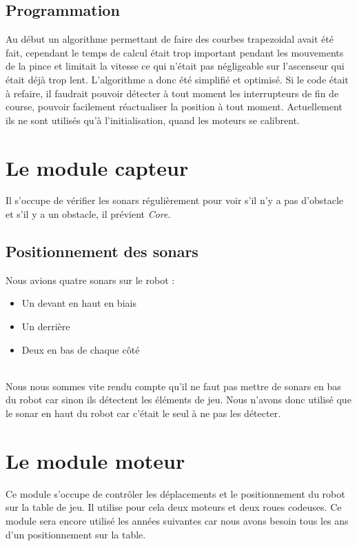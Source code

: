 \subsection{Programmation}
Au début un algorithme permettant de faire des courbes trapezoidal avait été fait, cependant le temps de calcul était trop important pendant les mouvements de la pince et limitait la vitesse ce qui n'était pas négligeable sur l'ascenseur qui était déjà trop lent. L'algorithme a donc été simplifié et optimisé. Si le code était à refaire, il faudrait pouvoir détecter à tout moment les interrupteurs de fin de course, pouvoir facilement réactualiser la position à tout moment. Actuellement ils ne sont utilisés qu'à l'initialisation, quand les moteurs se calibrent.

\section{Le module capteur}
Il s'occupe de vérifier les sonars régulièrement pour voir s'il n'y a pas d'obstacle et s'il y a un obstacle, il prévient \textit{Core}.

\subsection{Positionnement des sonars}
Nous avions quatre sonars sur le robot :\\

\begin{itemize}
	\item Un devant en haut en biais
	\item Un derrière
	\item Deux en bas de chaque côté
\end{itemize}\ \\

Nous nous sommes vite rendu compte qu'il ne faut pas mettre de sonars en bas du robot car sinon ils détectent les éléments de jeu. Nous n'avons donc utilisé que le sonar en haut du robot car c'était le seul à ne pas les détecter.


\section{Le module moteur}
Ce module s'occupe de contrôler les déplacements et le positionnement du robot sur la table de jeu. Il utilise pour cela deux moteurs et deux roues codeuses. Ce module sera encore utilisé les années suivantes car nous avons besoin tous les ans d'un positionnement sur la table.

